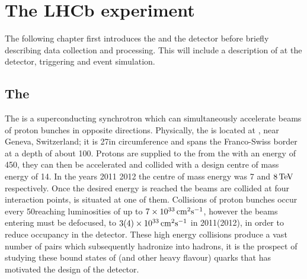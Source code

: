 \chapter{The LHCb experiment}
\label{ch:lhcb}

The following chapter first introduces the \lhc and the \lhcb detector before briefly
describing data collection and processing.
This will include a description of \pid at the \lhcb detector, triggering and event simulation.



\section{The \lhc}
The \lhc is a superconducting synchrotron which can simultaneously accelerate beams of proton bunches
in opposite directions.
Physically, the \lhc is located at \cern, near Geneva, Switzerland; it is 27\km in
circumference and spans the Franco-Swiss border at a depth of about 100\m.
Protons are supplied to the \lhc from the \sps with an energy of 450\gev, they can then
be accelerated and collided with a design centre of mass energy of 14\tev.
In the years 2011 2012 the centre of mass energy was 7 and $8\mathrm{\,Te\kern -0.1em V}$ respectively.
Once the desired energy is reached the beams are collided at four interaction points, \lhcb is
situated at one of them.
Collisions of proton bunches occur every 50\ns reaching luminosities of up to
$7\times 10^{33}\,\mathrm{cm}^{2}\mathrm{s}^{-1}$, however the beams entering \lhcb must be defocused, to
$3(4)\times 10^{33}\,\mathrm{cm}^{2}\mathrm{s}^{-1}$ in 2011(2012), in order to reduce occupancy in the
\lhcb detector.
These high energy collisions produce a vast number of \bbbar pairs which subsequently hadronize
into \bquark hadrons, it is the prospect of studying these bound states of \bquark (and other heavy
flavour) quarks that has motivated the design of the \lhcb detector.



